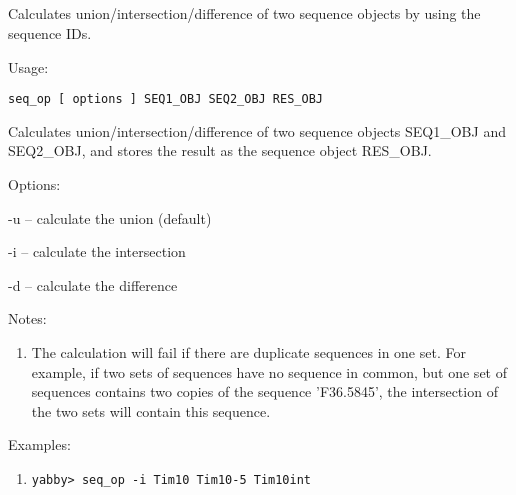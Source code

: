 

\subsection[seq\_op]{  }



Calculates union/intersection/difference of two sequence objects
by using the sequence IDs.


\begin{description}


\item{Usage:}

{\tt seq\_op [ options ] SEQ1\_OBJ SEQ2\_OBJ RES\_OBJ}

Calculates union/intersection/difference of two sequence objects
SEQ1\_OBJ and SEQ2\_OBJ, and stores the result as the sequence
object RES\_OBJ.


\item{Options:}
\begin{description}
\item -u -- calculate the union (default)
\item -i -- calculate the intersection
\item -d -- calculate the difference
\end{description}


\item{Notes:}
\begin{enumerate}
\item The calculation will fail if there are duplicate sequences in
      one set. For example, if two sets of sequences have no sequence
      in common, but one set of sequences contains two copies of the
      sequence 'F36.5845', the intersection of the two sets will contain
      this sequence.
\end{enumerate}


\item{Examples:}
\begin{enumerate}

\item
\begin{verbatim}
yabby> seq_op -i Tim10 Tim10-5 Tim10int


\end{verbatim}
\end{enumerate}
\end{description}
